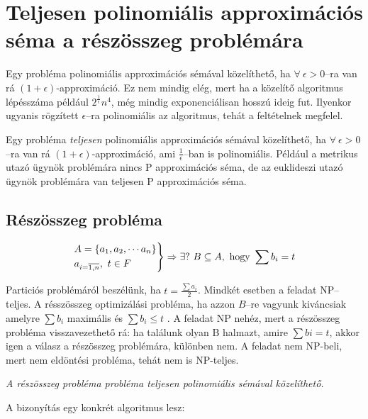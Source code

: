 \newpage
\section{Teljesen polinomiális approximációs séma a részösszeg problémára}

Egy probléma polinomiális approximációs sémával közelíthető, ha
$\forall~\epsilon>0$--ra van rá $(1+\epsilon)$-approximáció. Ez nem mindig elég,
mert ha a közelítő algoritmus lépésszáma például $2^{\frac{1}{\epsilon}}n^4$,
még mindig exponenciálisan hosszú ideig fut. Ilyenkor ugyanis rögzített
$\epsilon$--ra polinomiális az algoritmus, tehát a feltételnek megfelel.

Egy probléma \emph{teljesen} polinomiális approximációs sémával közelíthető, ha
$\forall~\epsilon>0$--ra van rá $(1+\epsilon)$-approximáció, ami
$\frac{1}{\epsilon}$--ban is polinomiális. Például a metrikus utazó ügynök
problémára nincs P approximációs séma, de az euklideszi utazó ügynök problémára
van teljesen P approximációs séma.

\subsection{Részösszeg probléma}

\[
\begin{rcases}
A=\{a_1, a_2, \cdots a_n\} \\
a_{i=\overline{1,n}},~t \in F
\end{rcases} \Rightarrow \exists ?~B \subseteq A,  \mbox{ hogy } \sum b_i =t 
\]

Particiós problémáról beszélünk, ha $t = \frac{\sum a_i}{2}$. Mindkét esetben a
feladat NP--teljes. A résszösszeg optimizálási probléma, ha azzon $B$--re
vagyunk kiváncsiak amelyre $\sum b_i$ maximális és $\sum b_i \leq t$ . A feladat
NP nehéz, mert a részösszeg probléma visszavezethető rá: ha találunk olyan B
halmazt, amire $\sum bi = t$, akkor igen a válasz a részösszeg problémára,
különben nem. A feladat nem NP-beli, mert nem eldöntési probléma, tehát nem is
NP-teljes.

\vspace{0.4cm}
\emph{A részösszeg probléma probléma teljesen polinomiális sémával közelíthető.}
 \vspace{0.4cm}
 
A bizonyítás egy konkrét algoritmus lesz:

